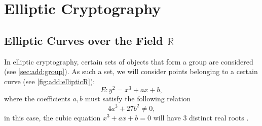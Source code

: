 \section{Elliptic Cryptography}

\subsection{Elliptic Curves over the Field $\mathbb{R}$}



In elliptic cryptography, certain sets of objects that form a group are considered (see \autoref{sec:add:group}). As such a set, we will consider points belonging to a certain curve (see \autoref{fig:add:ellipticR}):
\[
E: y^2 = x^3 +a x + b,
\]
where the coefficients $a,b$ must satisfy the following relation
\[
4 a^3 + 27 b^2 \ne 0,
\]
in this case, the cubic equation $x^3 + a x + b = 0$ will have 3 distinct real roots \cite{Washington:2008:ECN:1388394}. 



